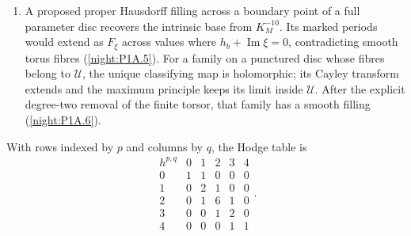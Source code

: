 \begin{enumerate}[label=\arabic*.]
  outside the component's rays $\pm(\{0,1\}^3\setminus\{0\})$.
  The corresponding monomial map contracts a divisor, contradicting
  a biholomorphism (\cref{night:P1.17}).
\item A proposed proper Hausdorff filling across a boundary point of
  a full parameter disc recovers the intrinsic base from $K_M^{-10}$.
  Its marked periods would extend as $F_\xi$ across values where
  $h_b+\operatorname{Im}\xi=0$, contradicting smooth torus fibres
  (\cref{night:P1A.5}).  For a family on a punctured disc whose
  fibres belong to $\mathcal U$, the unique classifying map is
  holomorphic; its Cayley transform extends and the maximum principle
  keeps its limit inside $\mathcal U$.  After the explicit degree-two
  removal of the finite torsor, that family has a smooth filling
  (\cref{night:P1A.6}).
\end{enumerate}

With rows indexed by $p$ and columns by $q$, the Hodge table is
\[
\begin{array}{c|ccccc}
 h^{p,q}&0&1&2&3&4\\\hline
 0&1&1&0&0&0\\
 1&0&2&1&0&0\\
 2&0&1&6&1&0\\
 3&0&0&1&2&0\\
 4&0&0&0&1&1
\end{array}.
\]

